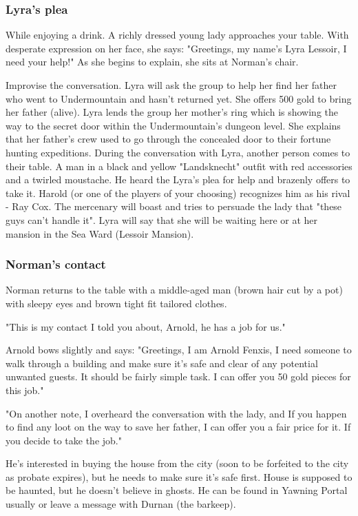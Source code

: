 \documentclass[10pt,onecolumn,twoside,openany,bg=full,layout=true]{dndbook}
\begin{document}
\subsubsection{Lyra's plea}
\begin{DndReadAloud}
  While enjoying a drink.
  A richly dressed young lady approaches your table.
  With desperate expression on her face, she says:
  "Greetings, my name's Lyra Lessoir, I need your help!"
  As she begins to explain, she sits at Norman's chair.
\end{DndReadAloud}
Improvise the conversation.
Lyra will ask the group to help her find her father who went to Undermountain and hasn't returned yet.
She offers 500 gold to bring her father (alive).
Lyra lends the group her mother's ring which is showing the way to the secret door within the Undermountain's dungeon level.
She explains that her father's crew used to go through the concealed door to their fortune hunting expeditions.
During the conversation with Lyra, another person comes to their table.
A man in a black and yellow "Landsknecht" outfit with red accessories and a twirled moustache.
He heard the Lyra's plea for help and brazenly offers to take it.
Harold (or one of the players of your choosing) recognizes him as his rival - Ray Cox.
The mercenary will boast and tries to persuade the lady that "these guys can't handle it".
Lyra will say that she will be waiting here or at her mansion in the Sea Ward (Lessoir Mansion).

\subsubsection{Norman's contact}
\begin{DndReadAloud}
  Norman returns to the table with a middle-aged man (brown hair cut by a pot) with sleepy eyes and brown tight fit tailored clothes.

  "This is my contact I told you about, Arnold, he has a job for us."

  Arnold bows slightly and says:
  "Greetings, I am Arnold Fenxis, I need someone to walk through a building and make sure it's safe and clear of any potential unwanted guests.
  It should be fairly simple task.
  I can offer you 50 gold pieces for this job."

  "On another note, I overheard the conversation with the lady, and If you happen to find any loot on the way to save her father, I can offer you a fair price for it.
  If you decide to take the job."
\end{DndReadAloud}
He's interested in buying the house from the city (soon to be forfeited to the city as probate expires), but he needs to make sure it's safe first.
House is supposed to be haunted, but he doesn't believe in ghosts.
He can be found in Yawning Portal usually or leave a message with Durnan (the barkeep).
\end{document}
